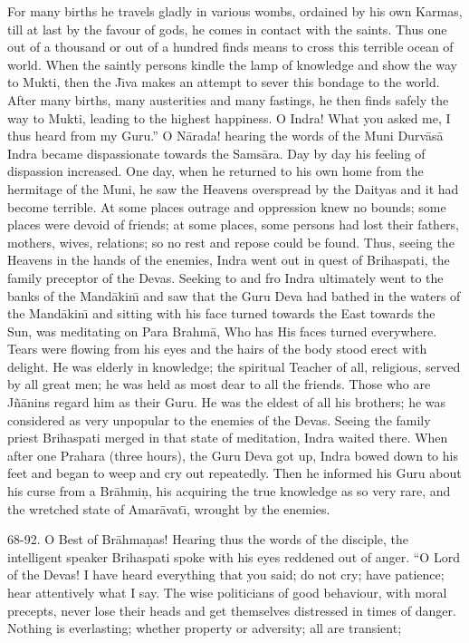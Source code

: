 For many births he travels gladly in various wombs, ordained by his own Karmas, till at last by the favour of gods, he comes in contact with the saints. Thus one out of a thousand or out of a hundred finds means to cross this terrible ocean of world. When the saintly persons kindle the lamp of knowledge and show the way to Mukti, then the J\={\i}va makes an attempt to sever this bondage to the world. After many births, many austerities and many fastings, he then finds safely the way to Mukti, leading to the highest happiness. O Indra! What you asked me, I thus heard from my Guru.'' O N\=arada! hearing the words of the Muni Durv\=as\=a Indra became dispassionate towards the Sams\=ara. Day by day his feeling of dispassion increased. One day, when he returned to his own home from the hermitage of the Muni, he saw the Heavens overspread by the Daityas and it had become terrible. At some places outrage and oppression knew no bounds; some places were devoid of friends; at some places, some persons had lost their fathers, mothers, wives, relations; so no rest and repose could be found. Thus, seeing the Heavens in the hands of the enemies, Indra went out in quest of Brihaspati, the family preceptor of the Devas. Seeking to and fro Indra ultimately went to the banks of the Mand\=akin\={\i} and saw that the Guru Deva had bathed in the waters of the Mand\=akin\={\i} and sitting with his face turned towards the East towards the Sun, was meditating on Para Brahm\=a, Who has His faces turned everywhere. Tears were flowing from his eyes and the hairs of the body stood erect with delight. He was elderly in knowledge; the spiritual Teacher of all, religious, served by all great men; he was held as most dear to all the friends. Those who are J\~n\=anins regard him as their Guru. He was the eldest of all his brothers; he was considered as very unpopular to the enemies of the Devas. Seeing the family priest Brihaspati merged in that state of meditation, Indra waited there. When after one Prahara (three hours), the Guru Deva got up, Indra bowed down to his feet and began to weep and cry out repeatedly. Then he informed his Guru about his curse from a Br\=ahmi\d{n}, his acquiring the true knowledge as so very rare, and the wretched state of Amar\=avat\={\i}, wrought by the enemies.

68-92. O Best of Br\=ahma\d{n}as! Hearing thus the words of the disciple, the intelligent speaker Brihaspati spoke with his eyes reddened out of anger. ``O Lord of the Devas! I have heard everything that you said; do not cry; have patience; hear attentively what I say. The wise politicians of good behaviour, with moral precepts, never lose their heads and get themselves distressed in times of danger. Nothing is everlasting; whether property or adversity; all are transient;

